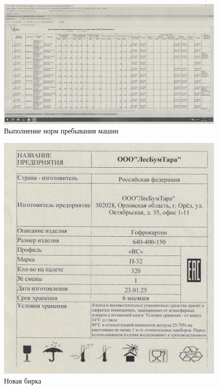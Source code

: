 \begin{figure}
\begin{center}
 \includegraphics[height=0.5\textheight, angle=90, keepaspectratio]{Pics/IX.1.,..jpg}
\end{center}
 \caption{Выполнение норм пребывания машин}
 \label{pic:IX.1.,.}
\end{figure}


\begin{figure}
\begin{center}
 \includegraphics[height=0.7\textheight, keepaspectratio]{Pics/IX.10.jpg}
\end{center}
 \caption{Новая бирка}
 \label{pic:IX.10}
\end{figure}

